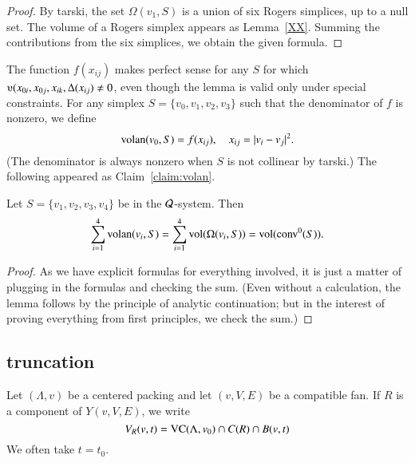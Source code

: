 \begin{proof} By tarski, the set $\Omega(v_1,S)$ is a union of
six Rogers simplices, up to a null set.  The volume of a Rogers simplex appears
as Lemma~\ref{XX}.  Summing the contributions from the six simplices, we obtain
the given formula.
\end{proof}

The function $f(x_{ij})$ makes perfect sense for any $S$ for which $\ups(x_{0i},x_{0j},x_{ik},\Delta(x_{ij})\ne 0$,
even though the lemma is valid only under special constraints.
For any simplex $S=\{v_0,v_1,v_2,v_3\}$ such that the denominator of $f$ is nonzero, we define
$$
{\operatorname{volan}}(v_0,S) = f(x_{ij}),\quad x_{ij} = |v_i-v_j|^2.
$$  
(The denominator is always nonzero when $S$ is not collinear by tarski.)
The following appeared as Claim~\ref{claim:volan}.

\begin{lemma}  %
Let $S=\{v_1,v_2,v_3,v_4\}$ be in the ${\mathcal Q}$-system. Then
    $$
    \sum_{i=1}^4 {\operatorname{volan}}(v_i,S) = \sum_{i=1}^4
    {\operatorname{vol}}(\Omega(v_i,S)) = {\operatorname{vol}}({\operatorname{conv}}^0(S)).
    $$
\end{lemma}

\begin{proof} As we have explicit formulas for everything involved,
it is just a matter of plugging in the formulas and checking the sum.
(Even without a calculation, the lemma follows by the principle of analytic continuation;
but in the interest of proving everything from first principles, we
check the sum.)
\end{proof}

\subsection{truncation}

Let $(\Lambda,v)$ be a centered packing and let $(v,V,E)$ be a compatible
fan.
If $R$ is a component of $Y(v,V,E)$, we write 
  $$
  V_R(v,t) = {\operatorname{VC}}(\Lambda,v_0)\cap C(R)\cap B(v,t)
  $$
We often
take $t=t_0$.




